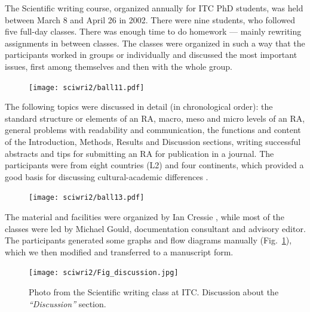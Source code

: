 \documentclass[graybox,envcountchap,sectrefs,UStrade]{svmono}
\begin{document}
The Scientific writing course, organized annually for ITC PhD students, was held between March 8 and April 26 in 2002. There were nine students, who followed five full-day classes. There was enough time to do homework --- mainly rewriting assignments in between classes. The classes were organized in such a way that the participants worked in groups or individually and discussed the most important issues, first among themselves and then with the whole group. \par

\begin{figure}
\vspace{-20pt}
\texttt{[image: sciwri2/ball11.pdf]}
\vspace{-20pt}
\end{figure}
The following topics were discussed in detail (in chronological order): the standard structure or elements of an RA, macro, meso and micro levels of an RA, general problems with readability and communication, the functions and content of the Introduction, Methods, Results and Discussion sections, writing successful abstracts and tips for submitting an RA for publication in a journal.  The participants were from eight countries (L2) and four continents, which provided a good basis for discussing cultural-academic differences \citep{Prince1999}. \par

\begin{figure}
\vspace{-20pt}
\texttt{[image: sciwri2/ball13.pdf]}
\vspace{-20pt}
\end{figure}
The material and facilities were organized by Ian Cressie \citeyear{Cressie2002}, while most of the classes were led by Michael Gould, documentation consultant and advisory editor. The participants generated some graphs and flow diagrams manually (Fig.\@~\ref{Fig:ITCgroup}), which we then modified and transferred to a manuscript form. \par

\begin{figure}[!htb]
\begin{center}
\texttt{[image: sciwri2/Fig\_discussion.jpg]}
\caption{Photo from the Scientific writing class at ITC. Discussion about the \emph{``Discussion''} section.} \label{Fig:ITCgroup}
\end{center}
\end{figure}
\end{document}
